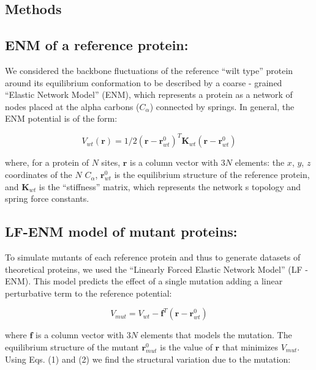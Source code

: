 \documentclass{article}
\begin{document}
\begin{multicols}{2}
\section{Methods}

{\subsection* {ENM of a reference protein:} 

We considered the backbone fluctuations of the reference ``wilt type'' protein around its equilibrium conformation to be described by a coarse - grained ``Elastic Network Model'' (ENM), which represents a protein as a network of nodes placed at the alpha carbons ($C_{\alpha}$) connected by springs. In general, the ENM potential is of the form: 

\begin{equation}
V_{wt}(\mathbf{r}) = 1/2(\mathbf{r}-\mathbf{r}^{0}_{wt})^{T}\mathbf{K}_{wt}(\mathbf{r}-\mathbf{r}^{0}_{wt})
\end{equation}

where, for a protein of $N$ sites, $\mathbf{r}$ is a column vector with $3N$ elements: the $x$, $y$, $z$ coordinates of the $N$ $C_{\alpha}$, $\mathbf{r}^{0}_{wt}$ is the equilibrium structure of the reference protein, and $\mathbf{K}_{wt}$ is the ``stiffness'' matrix, which represents the network\textsc{} s topology and spring force constants.  

\subsection*{LF-ENM model of mutant proteins:}

To simulate mutants of each reference protein and thus to generate datasets of theoretical proteins, we used the ``Linearly Forced Elastic Network Model'' (LF - ENM). This model predicts the effect of a single mutation adding a linear perturbative term to the reference potential:

\begin{equation}
V_{mut}=V_{wt} - \mathbf{f}^{T}(\mathbf{r}-\mathbf{r}^{0}_{wt})
\end{equation}

where $\mathbf{f}$ is a column vector with $3N$ elements that models the mutation. The equilibrium structure of the mutant $\mathbf{r}^{0}_{mut}$ is the value of $\mathbf{r}$ that minimizes $V_{mut}$. Using Eqs. (1) and (2) we find the structural variation due to the mutation:

}
\end{multicols}
\end{document}
